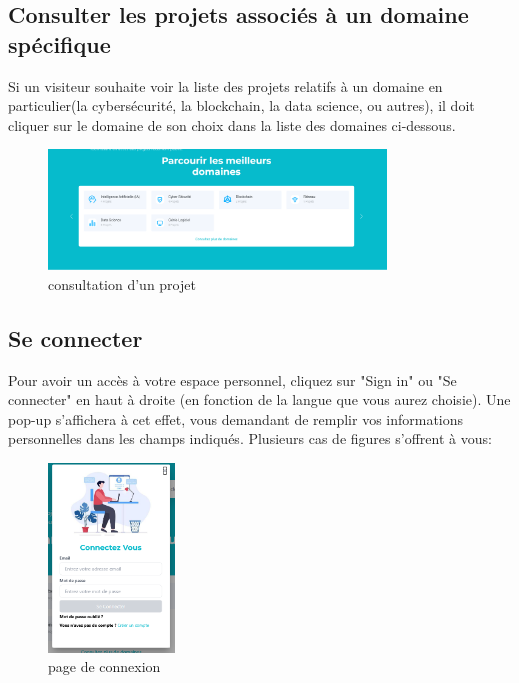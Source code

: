 \documentclass[12pt]{article}
\begin{document}
\medskip
\subsection{Consulter les projets associés à un domaine spécifique}
Si un visiteur souhaite voir la liste des projets relatifs à un domaine en particulier(la cybersécurité, la blockchain, la data science, ou autres), il doit cliquer sur le domaine de son choix dans la liste des domaines ci-dessous. 
\medskip

\begin{figure}[h!]
    \centering
    \includegraphics[width=0.8\textwidth]{./images/project-by-domain.png}
    \caption{consultation d'un projet}
    \label{fig:consultation d'un projet}
\end{figure}
\subsection{Se connecter}
Pour avoir un accès à votre espace personnel, cliquez sur "Sign in" ou "Se connecter" en haut à droite (en fonction de la langue que vous aurez choisie). Une pop-up s'affichera à cet effet, vous demandant de remplir vos informations personnelles dans les champs indiqués. Plusieurs cas de figures s'offrent à vous:

\medskip
\begin{figure}[h!]
    \centering
    \includegraphics[width=0.3\textwidth]{./images/Connexion.png}
    \caption{page de connexion}
    \label{fig:page de connexion}
\end{figure}
\end{document}
